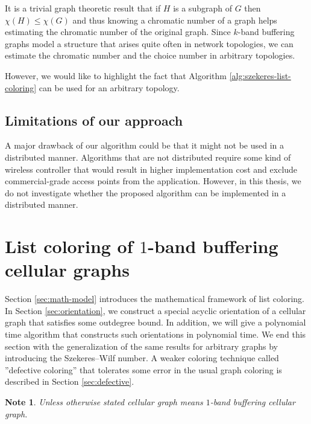 \documentclass[a4paper, 12pt]{article}
\newtheorem{note}[lem]{Note}
\begin{document}
It is a trivial graph theoretic result that if $H$ is a subgraph of $G$ then $\chi(H) \leqslant \chi(G)$ and thus knowing a chromatic number of a graph helps estimating the chromatic number of the original graph. Since $k$-band buffering graphs model a structure that arises quite often in network topologies, we can estimate the chromatic number and the choice number in arbitrary topologies.

However, we would like to highlight the fact that Algorithm \ref{alg:szekeres-list-coloring} can be used for an arbitrary topology.

\subsection{Limitations of our approach}

A major drawback of our algorithm could be that it might not be used in a distributed manner. Algorithms that are not distributed require some kind of wireless controller that would result in higher implementation cost and exclude commercial-grade access points from the application. However, in this thesis, we do not investigate whether the proposed algorithm can be implemented in a distributed manner.

\newpage
\section{List coloring of $1$-band buffering cellular graphs} \label{ch:list-coloring}
Section \ref{sec:math-model} introduces the mathematical framework of list coloring. In Section \ref{sec:orientation}, we construct a special acyclic orientation of a cellular graph that satisfies some outdegree bound. In addition, we will give a polynomial time algorithm that constructs such orientations in polynomial time. We end this section with the generalization of the same results for arbitrary graphs by introducing the Szekeres\---Wilf number. A weaker coloring technique called ''defective coloring'' that tolerates some error in the usual graph coloring is described in Section \ref{sec:defective}.

\begin{note} Unless otherwise stated cellular graph means $1$-band buffering cellular graph.
\end{note}
\end{document}
